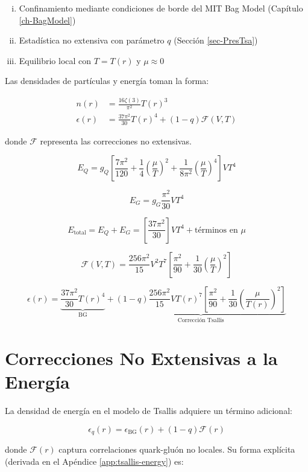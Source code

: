 \begin{enumerate}[i.]
    \item Confinamiento mediante condiciones de borde del MIT Bag Model (Capítulo \ref{ch-BagModel})
    \item Estadística no extensiva con parámetro $q$ (Sección \ref{sec-PresTsa})
    \item Equilibrio local con $T = T(r)$ y $\mu \approx 0$
\end{enumerate}

Las densidades de partículas y energía toman la forma:

\begin{align}
n(r) &= \frac{16\zeta(3)}{\pi^2}T(r)^3 \label{eq-density} \\
\epsilon(r) &= \frac{37\pi^2}{30}T(r)^4 + (1-q)\mathcal{F}(V,T) \label{eq-energy}
\end{align}

donde $\mathcal{F}$ representa las correcciones no extensivas.

$$
E_Q = g_Q \left[\frac{7\pi^2}{120} + \frac{1}{4}\left(\frac{\mu}{T}\right)^2 + \frac{1}{8\pi^2}\left(\frac{\mu}{T}\right)^4\right]VT^4
$$

$$
E_G = g_G \frac{\pi^2}{30}VT^4
$$

$$
E_{\text{total}} = E_Q + E_G = \left[\frac{37\pi^2}{30}\right]VT^4 + \text{términos en }\mu
$$

$$
\mathcal{F}(V,T) = \frac{256\pi^2}{15} V^2 T^7 \left[\frac{\pi^2}{90} + \frac{1}{30}\left(\frac{\mu}{T}\right)^2\right]
$$


\begin{equation}
    \epsilon(r) = \underbrace{\frac{37\pi^2}{30}T(r)^4}_{\text{BG}} + \underbrace{(1-q)\frac{256\pi^2}{15}V T(r)^7\left[\frac{\pi^2}{90} + \frac{1}{30}\left(\frac{\mu}{T(r)}\right)^2\right]}_{\text{Corrección Tsallis}}
\end{equation}

\section{Correcciones No Extensivas a la Energía} \label{sec:correcciones-tsallis}
La densidad de energía en el modelo de Tsallis adquiere un término adicional:

\begin{equation}
\epsilon_q(r) = \epsilon_{\text{BG}}(r) + (1-q)\mathcal{F}(r)
\end{equation}

donde $\mathcal{F}(r)$ captura correlaciones quark-gluón no locales. Su forma explícita (derivada en el Apéndice \ref{app:tsallis-energy}) es:


